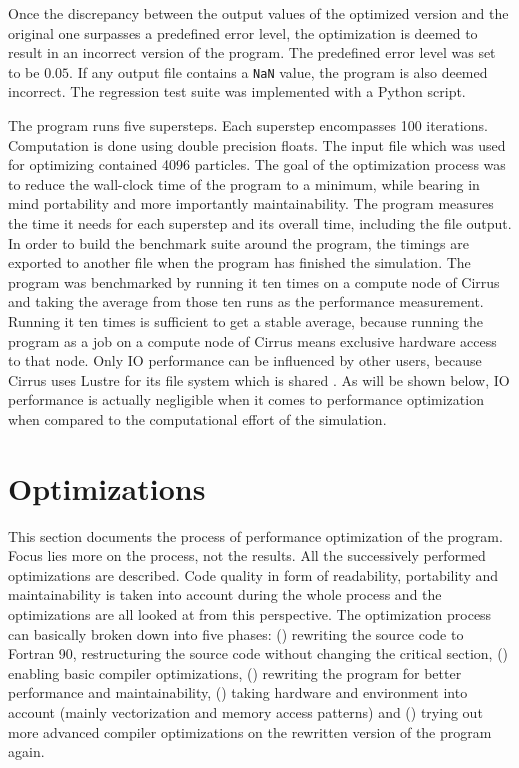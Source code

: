 \documentclass[twoside,11pt]{article}
\begin{document}
Once the discrepancy between the output values of the optimized
version and the original one surpasses a predefined error level,
the optimization is deemed to result in an incorrect version of the
program.
The predefined error level was set to be $0.05$.
If any output file contains a \texttt{NaN} value, the program is
also deemed incorrect.
The regression test suite was implemented with a Python script.

The program runs five supersteps.
Each superstep encompasses 100 iterations.
Computation is done using double precision floats.
The input file which was used for optimizing contained 4096 particles.
The goal of the optimization process was to reduce the wall-clock
time of the program to a minimum, while bearing in mind portability
and more importantly maintainability.
The program measures the time it needs for each superstep and its
overall time, including the file output.
In order to build the benchmark suite around the program, the timings
are exported to another file when the program has finished the
simulation.
The program was benchmarked by running it ten times on a compute node
of Cirrus and taking the average from those ten runs as the
performance measurement.
Running it ten times is sufficient to get a stable average,
because running the program as a job on a compute node of Cirrus
means exclusive hardware access to that node.
Only IO performance can be influenced by other users, because Cirrus
uses Lustre for its file system which is shared
\citep{cirrus_hardware}.
As will be shown below, IO performance is actually negligible when
it comes to performance optimization when compared to the
computational effort of the simulation.


\section{Optimizations} %
\label{sec:opt}

This section documents the process of performance optimization of the
program.
Focus lies more on the process, not the results.
All the successively performed optimizations are described.
Code quality in form of readability, portability and maintainability
is taken into account during the whole process and the optimizations
are all looked at from this perspective.
The optimization process can basically broken down into five phases:
() rewriting the source code to Fortran 90,
restructuring the source code without changing the critical section,
() enabling basic compiler optimizations,
() rewriting the program for better performance and
maintainability, () taking hardware and environment
into account (mainly vectorization and memory access patterns) and
() trying out more advanced compiler optimizations on
the rewritten version of the program again.
\end{document}

